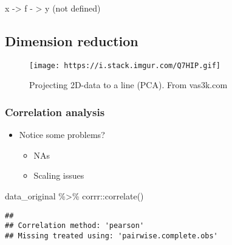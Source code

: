 \documentclass[
]{book}
\newenvironment{Shaded}{\begin{snugshade}}{\end{snugshade}}
\newcommand{\FunctionTok}[1]{\textcolor[rgb]{0.00,0.00,0.00}{#1}}
\newcommand{\NormalTok}[1]{#1}
\newcommand{\SpecialCharTok}[1]{\textcolor[rgb]{0.00,0.00,0.00}{#1}}
\begin{document}
x -\textgreater{} f - \textgreater{} y (not defined)

\hypertarget{dimension-reduction}{%
\subsection{Dimension reduction}\label{dimension-reduction}}

\begin{figure}
\centering
\texttt{[image: https://i.stack.imgur.com/Q7HIP.gif]}
\caption{Projecting 2D-data to a line (PCA). From vas3k.com}
\end{figure}

\hypertarget{correlation-analysis}{%
\subsubsection{Correlation analysis}\label{correlation-analysis}}

\begin{itemize}
\item
  Notice some problems?

  \begin{itemize}
  \item
    NAs
  \item
    Scaling issues
  \end{itemize}
\end{itemize}

\begin{Shaded}
\begin{Highlighting}[]
\NormalTok{data\_original }\SpecialCharTok{\%\textgreater{}\%}
\NormalTok{  corrr}\SpecialCharTok{::}\FunctionTok{correlate}\NormalTok{()}
\end{Highlighting}
\end{Shaded}

\begin{verbatim}
## 
## Correlation method: 'pearson'
## Missing treated using: 'pairwise.complete.obs'
\end{verbatim}
\end{document}
